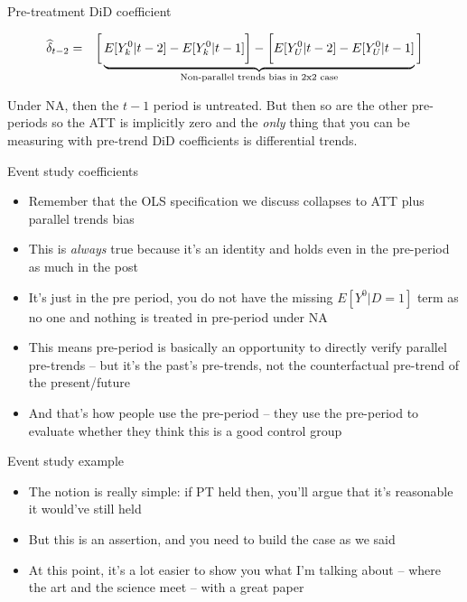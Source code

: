 \documentclass{beamer}
\begin{document}
\begin{frame}{Pre-treatment DiD coefficient}

\begin{eqnarray*}
\widehat{\delta}_{t-2} &=& \bigg [  \underbrace{\textcolor{black}{E[Y^0_k | t-2]} - E[Y^0_k | t-1] \bigg ] - \bigg [ E[Y^0_U | t-2] - E[Y_U^0 | t-1] }_{\mathclap{\text{Non-parallel trends bias in 2x2 case}}} \bigg ]
\end{eqnarray*}

\bigskip

Under NA, then the $t-1$ period is untreated.  But then so are the other pre-periods so the ATT is implicitly zero and the \emph{only} thing that you can be measuring with pre-trend DiD coefficients is differential trends.  


\end{frame}



\begin{frame}{Event study coefficients}

\begin{itemize}
\item Remember that the OLS specification we discuss collapses to ATT plus parallel trends bias
\item This is \emph{always} true because it's an identity and holds even in the pre-period as much in the post
\item It's just in the pre period, you do not have the missing $E[Y^0|D=1]$ term as no one and nothing is treated in pre-period under NA
\item This means pre-period is basically an opportunity to directly verify parallel pre-trends -- but it's the past's pre-trends, not the counterfactual pre-trend of the present/future
\item And that's how people use the pre-period -- they use the pre-period to evaluate whether they think this is a good control group
\end{itemize}

\end{frame}

\begin{frame}{Event study example}

\begin{itemize}
\item The notion is really simple: if PT held then, you'll argue that it's reasonable it would've still held
\item But this is an assertion, and you need to build the case as we said
\item At this point, it's a lot easier to show you what I'm talking about -- where the art and the science meet -- with a great paper
\end{itemize}

\end{frame}
\end{document}
